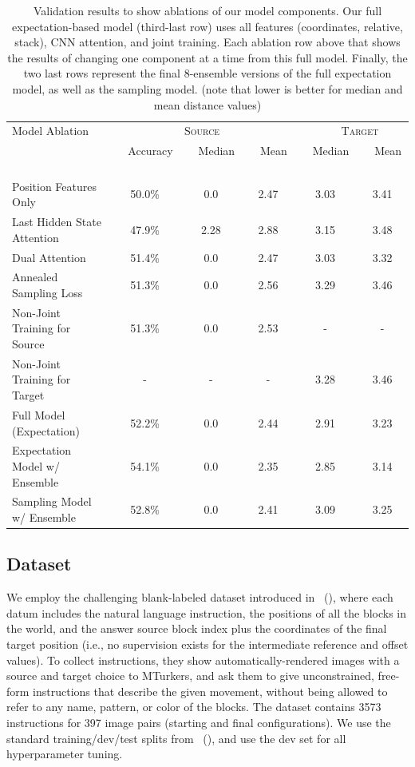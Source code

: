 \documentclass[letterpaper]{article} %
\newcommand{\newcite}[1]{\citeauthor{#1} (\citeyear{#1})}
\begin{document}
\begin{table}[ht!]
\begin{center}
\begin{tabular}{|l|ccc|cc|}
\hline
\multirow{1}{*}{Model Ablation } & \multicolumn{3}{c|}{\textsc{Source}} & \multicolumn{2}{c|}{\textsc{ \ \ \ Target}} \\
  &  \ \ Accuracy \ \  & \ \  Median \ \  &  \ \ Mean  \ \  & \ \  Median \ \  &  \ \ Mean \ \  \\
\hline
Position Features Only				&	50.0\%			&	0.0		&	2.47	&	3.03	&	3.41	\\
\hline
Last Hidden State Attention	& 	47.9\%	&	2.28	&	2.88	&	3.15	&	3.48	\\
Dual Attention 	& 	51.4\%	&	0.0		&	2.47	&	3.03	&	3.32	\\
\hline
Annealed Sampling Loss			&	51.3\%		&	0.0	&	2.56	&	3.29	&	3.46	\\
\hline
Non-Joint Training for Source \ \ \ \ \ \ 	&	51.3\%		&	0.0			&	2.53	&	-	&	-	\\
Non-Joint Training for Target	&	-		&	-			& -	&	3.28	&	3.46	\\
\hline
Full Model (Expectation)	&	52.2\%	&	0.0		&	2.44	&	2.91	&	3.23	\\
\hline
\hline
Expectation Model w/ Ensemble	&	54.1\%	&	0.0		&	2.35	&	2.85	&	3.14	\\
Sampling Model w/ Ensemble	&	52.8\%	&	0.0		&	2.41	&	3.09	&	3.25	\\
\hline
\end{tabular}
\end{center}
\caption{Validation results to show ablations of our model components. Our full expectation-based model (third-last row) uses all features (coordinates, relative, stack), CNN attention, and joint training. Each ablation row above that shows the results of changing one component at a time from this full model. Finally, the two last rows represent the final 8-ensemble versions of the full expectation model, as well as the sampling model. (note that lower is better for median and mean distance values)}
\label{table:valid}
\end{table}



\subsection{Dataset}
We employ the challenging blank-labeled dataset introduced in~\newcite{bisk2016natural}, where each datum includes the natural language instruction, the positions of all the blocks in the world, and the answer source block index plus the coordinates of the final target position (i.e., no supervision exists for the intermediate reference and offset values).
To collect instructions, they show automatically-rendered images with a source and target choice to MTurkers, and ask them to give unconstrained, free-form instructions that describe the given movement, without being allowed to refer to any name, pattern, or color of the blocks.
The dataset contains 3573 instructions for 397 image pairs (starting and final configurations).
We use the standard training/dev/test splits from~\newcite{bisk2016natural}, and use the dev set for all hyperparameter tuning.
\end{document}
